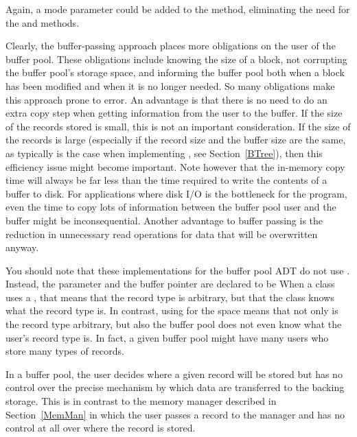
Again, a mode parameter could be added to the 
method, eliminating the need for the  and
 methods.

Clearly, the buffer-passing approach places more obligations on the
user of the buffer pool.
These obligations include knowing the size of a block, not corrupting
the buffer pool's storage space, and informing the buffer pool both
when a block has been modified and when it is no longer needed.
So many obligations make this approach prone to error.
An advantage is that there is no need to do an extra copy step when
getting information from the user to the buffer.
If the size of the records stored is small, this is not an important
consideration.
If the size of the records is large (especially if the record size and 
the buffer size are the same, as typically is the case when
implementing \Btrees, see Section~\ref{BTree}), then this efficiency
issue might become important.
Note however that the in-memory copy time will always be far less than
the time required to write the contents of a buffer to disk.
For applications where disk I/O is the bottleneck for the program,
even the time to copy lots of information between the buffer pool user
and the buffer might be inconsequential.
Another advantage to buffer passing is the reduction in unnecessary
read operations for data that will be overwritten anyway.

You should note that these implementations for the buffer pool ADT
do not use \Gens.
Instead, the  parameter and the buffer pointer are declared
to be
When a class uses a \Gen, that means that the record type is
arbitrary, but that the class knows what the record type is.
In contrast, using
for the space means that not 
only is the record type arbitrary, but also the buffer pool does not
even know what the user's record type is.
In fact, a given buffer pool might have many users who store many types 
of records.

In a buffer pool, the user decides where a given record will be stored
but has no control over the precise mechanism by which data are
transferred to the backing storage.
This is in contrast to the memory manager described in
Section~\ref{MemMan} in which the user passes a record to the manager
and has no control at all over where the record is stored.

